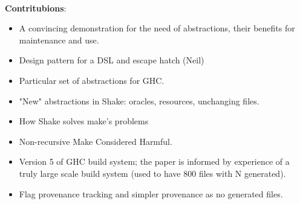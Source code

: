 ~\\
\textbf{Contritubions}:
\begin{itemize}
  \item A convincing demonstration for the need of abstractions,
  their benefits for maintenance and use.
  \item Design pattern for a DSL and escape hatch (Neil)
  \item Particular set of abstractions for GHC.
  \item "New" abstractions in Shake: oracles, resources, unchanging files.
  \item How Shake solves make's problems
  \item Non-recursive Make Considered Harmful.
  \item Version 5 of GHC build system; the paper is informed by
  experience of a truly large scale build system (used to 
  have 800 files with N generated).
  \item Flag provenance tracking and simpler provenance as no
  generated files. 
\end{itemize}
